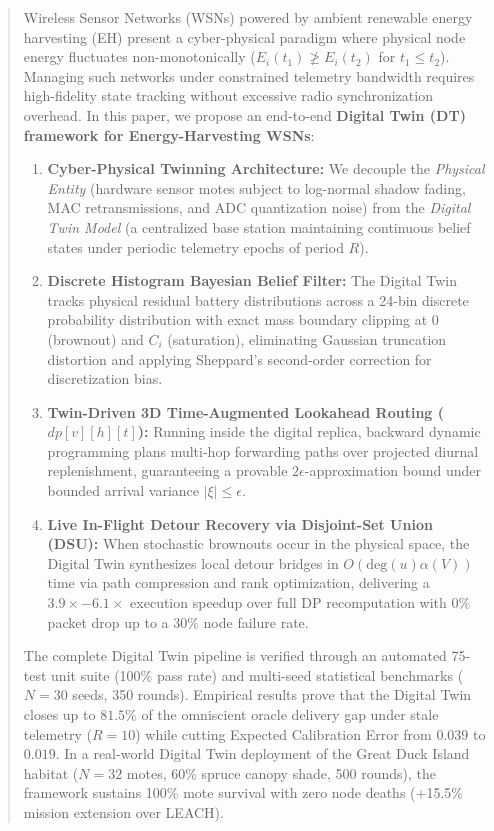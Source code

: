 \documentclass[journal]{IEEEtran}
\begin{document}
\begin{abstract}
Wireless Sensor Networks (WSNs) powered by ambient renewable energy harvesting (EH) present a cyber-physical paradigm where physical node energy fluctuates non-monotonically ($E_i(t_1) \not\ge E_i(t_2)$ for $t_1 \le t_2$). Managing such networks under constrained telemetry bandwidth requires high-fidelity state tracking without excessive radio synchronization overhead. In this paper, we propose an end-to-end \textbf{Digital Twin (DT) framework for Energy-Harvesting WSNs}:
\begin{enumerate}
    \item \textbf{Cyber-Physical Twinning Architecture:} We decouple the \textit{Physical Entity} (hardware sensor motes subject to log-normal shadow fading, MAC retransmissions, and ADC quantization noise) from the \textit{Digital Twin Model} (a centralized base station maintaining continuous belief states under periodic telemetry epochs of period $R$).
    \item \textbf{Discrete Histogram Bayesian Belief Filter:} The Digital Twin tracks physical residual battery distributions across a 24-bin discrete probability distribution with exact mass boundary clipping at 0 (brownout) and $C_i$ (saturation), eliminating Gaussian truncation distortion and applying Sheppard's second-order correction for discretization bias.
    \item \textbf{Twin-Driven 3D Time-Augmented Lookahead Routing ($dp[v][h][t]$):} Running inside the digital replica, backward dynamic programming plans multi-hop forwarding paths over projected diurnal replenishment, guaranteeing a provable $2\epsilon$-approximation bound under bounded arrival variance $|\xi| \le \epsilon$.
    \item \textbf{Live In-Flight Detour Recovery via Disjoint-Set Union (DSU):} When stochastic brownouts occur in the physical space, the Digital Twin synthesizes local detour bridges in $O(\text{deg}(u)\alpha(V))$ time via path compression and rank optimization, delivering a $3.9\times - 6.1\times$ execution speedup over full DP recomputation with $0\%$ packet drop up to a $30\%$ node failure rate.
\end{enumerate}
The complete Digital Twin pipeline is verified through an automated 75-test unit suite (100\% pass rate) and multi-seed statistical benchmarks ($N=30$ seeds, 350 rounds). Empirical results prove that the Digital Twin closes up to $81.5\%$ of the omniscient oracle delivery gap under stale telemetry ($R=10$) while cutting Expected Calibration Error from $0.039$ to $0.019$. In a real-world Digital Twin deployment of the Great Duck Island habitat ($N=32$ motes, 60\% spruce canopy shade, 500 rounds), the framework sustains 100\% mote survival with zero node deaths (+15.5\% mission extension over LEACH).
\end{abstract}
\end{document}
